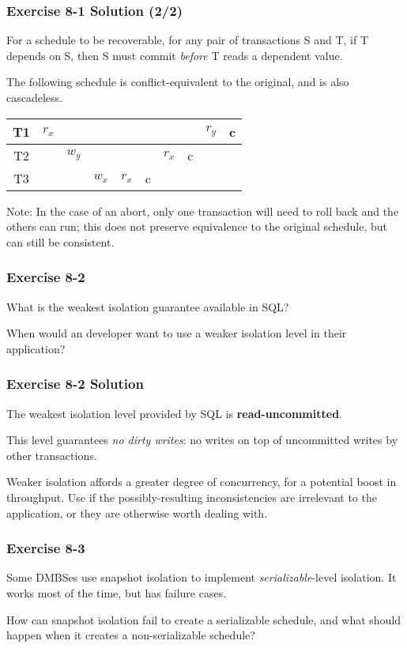 \begin{frame}
\frametitle{Exercise 8-1 Solution (2/2)}

For a schedule to be recoverable, for any pair of transactions S and T, if T depends on S, then S must commit \textit{before} T reads a dependent value.

The following schedule is conflict-equivalent to the original, and is also cascadeless.

\begin{center}
\begin{tabular}{ c c c c c c c c c c }
  \hline
  T1 & $r_x$ & & & & & & & $r_y$ & c \\
  \hline
  T2 & & $w_y$ & & & & $r_x$ & c & & \\
  \hline
  T3 & & & $w_x$ & $r_x$ & c & & & & \\
  \hline
\end{tabular}
\end{center}

Note: In the case of an abort, only one transaction will need to roll back and the others can run; this does not preserve equivalence to the original schedule, but can still be consistent.

\end{frame}


\begin{frame}
\frametitle{Exercise 8-2}

What is the weakest isolation guarantee available in SQL?

When would an developer want to use a weaker isolation level in their application?

\end{frame}


\begin{frame}
\frametitle{Exercise 8-2 Solution}

The weakest isolation level provided by SQL is \textbf{read-uncommitted}.

This level guarantees \textit{no dirty writes}: no writes on top of uncommitted writes by other transactions.

Weaker isolation affords a greater degree of concurrency, for a potential boost in throughput. Use if the possibly-resulting inconsistencies are irrelevant to the application, or they are otherwise worth dealing with.

\end{frame}


\begin{frame}
\frametitle{Exercise 8-3}

Some DMBSes use snapshot isolation to implement \textit{serializable}-level isolation. It works most of the time, but has failure cases.

How can snapshot isolation fail to create a serializable schedule, and what should happen when it creates a non-serializable schedule?

\end{frame}


